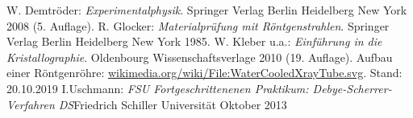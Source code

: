 \documentclass[a4paper,twoside,final]{article}
\begin{document}

\begin{thebibliography}{xxx}
	W. Demtröder: \textit{Experimentalphysik}. Springer Verlag Berlin Heidelberg New York 2008 (5. Auflage).
	R. Glocker: \textit{Materialprüfung mit Röntgenstrahlen}. Springer Verlag Berlin Heidelberg New York 1985.
	W. Kleber u.a.: \textit{Einführung in die Kristallographie}. Oldenbourg Wissenschaftsverlage 2010 (19. Auflage).
  Aufbau einer Röntgenröhre: \url{wikimedia.org/wiki/File:WaterCooledXrayTube.svg}. Stand: 20.10.2019
  I.Uschmann: \textit{FSU Fortgeschrittenenen Praktikum: Debye-Scherrer-Verfahren DS}Friedrich Schiller Universität Oktober 2013
\end{thebibliography}
\end{document}
